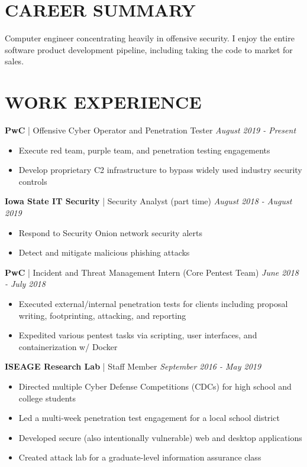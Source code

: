 \documentclass[line]{res}
\begin{document}
\address{linkedin.com/in/daniellimanowski/ | b1tst0rm.net}

\begin{resume}
\section{CAREER SUMMARY}
Computer engineer concentrating heavily in offensive security. I enjoy the entire software product development pipeline, including taking the code to market for sales.

\section{WORK EXPERIENCE}
\textbf{PwC} | Offensive Cyber Operator and Penetration Tester \hfill \textit{August 2019 - Present}
\begin{itemize}
	\item Execute red team, purple team, and penetration testing engagements
	\item Develop proprietary C2 infrastructure to bypass widely used industry security controls
\end{itemize}
\textbf{Iowa State IT Security} | Security Analyst (part time) \hfill \textit{August 2018 - August 2019}
\begin{itemize}
	\item Respond to Security Onion network security alerts
	\item Detect and mitigate malicious phishing attacks
\end{itemize}
\textbf{PwC} | Incident and Threat Management Intern (Core Pentest Team) \hfill \textit{June 2018 - July 2018}
\begin{itemize}
	\item Executed external/internal penetration tests for clients including proposal writing, footprinting, attacking, and reporting
	\item Expedited various pentest tasks via scripting, user interfaces, and containerization w/ Docker
\end{itemize}

\textbf{ISEAGE Research Lab} | Staff Member \hfill \textit{September 2016 - May 2019}
\begin{itemize}
	\item Directed multiple Cyber Defense Competitions (CDCs) for high school and college students
	\item Led a multi-week penetration test engagement for a local school district
	\item Developed secure (also intentionally vulnerable) web and desktop applications
	\item Created attack lab for a graduate-level information assurance class
\end{itemize}


\end{resume}
\end{document}
